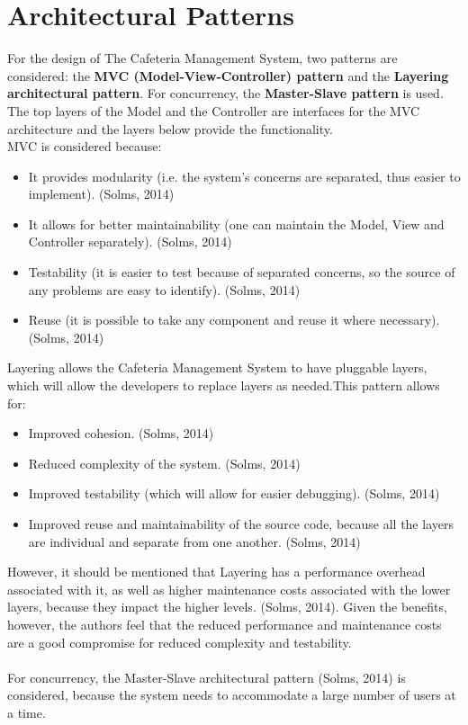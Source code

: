 \documentclass[a4paper,12pt]{article}
\begin{document}
\section{Architectural Patterns}
For the design of The Cafeteria Management System, two patterns are considered: the \textbf{MVC (Model-View-Controller) pattern} and the \textbf{Layering architectural pattern}. For concurrency, the \textbf{Master-Slave pattern} is used.\\
The top layers of the Model and the Controller are interfaces for the MVC architecture and the layers below provide the functionality.\\
MVC is considered because:
	\begin{itemize}
	\item It provides modularity (i.e. the system's concerns are separated, thus easier to implement). (Solms, 2014)
	\item It allows for better maintainability (one can maintain the Model, View and Controller separately). (Solms, 2014)				\item Testability (it is easier to test because of separated concerns, so the source of any problems are easy to identify). 	
	(Solms, 2014)
	\item Reuse (it is possible to take any component and reuse it where necessary). (Solms, 2014)
	\end{itemize} 
Layering allows the Cafeteria Management System to have pluggable layers, which will allow the developers to replace layers as needed.This pattern allows for: 
		\begin{itemize}
		\item Improved cohesion. (Solms, 2014)
		\item Reduced complexity of the system. (Solms, 2014)
		\item Improved testability (which will allow for easier debugging). (Solms, 2014)
		\item Improved reuse and maintainability of the source code, because all the layers are individual and separate from 	
		one another. (Solms, 2014)
		\end{itemize}
However, it should be mentioned that Layering has a performance overhead associated with it, as well as higher maintenance costs associated with the lower layers, because they impact the higher levels. (Solms, 2014). Given the benefits, however, the authors feel that the reduced performance and maintenance costs are a good compromise for reduced complexity and testability.\\
\\
For concurrency, the Master-Slave architectural pattern (Solms, 2014) is considered, because the system needs to accommodate a large number of users at a time.
\end{document}
